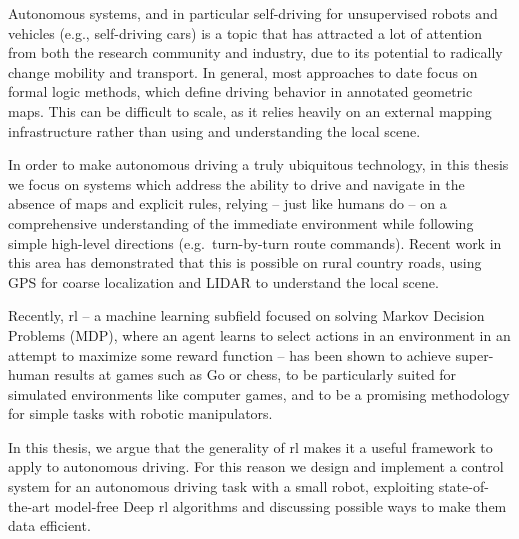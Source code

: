 		
			Autonomous systems, and in particular self-driving for unsupervised robots and vehicles (e.g., self-driving cars) is a topic that has attracted a lot of attention from both the research community and industry, due to its potential to radically change mobility and transport. In general, most approaches to date focus on formal logic methods, which define driving behavior in annotated geometric maps. This can be difficult to scale, as it relies heavily on an external mapping infrastructure rather than using and understanding the local scene.
			
			In order to make autonomous driving a truly ubiquitous technology, in this thesis we focus on systems which address the ability to drive and navigate in the absence of maps and explicit rules, relying – just like humans do – on a comprehensive understanding of the immediate environment while following simple high-level directions (e.g.\ turn-by-turn route commands). Recent work in this area has demonstrated that this is possible on rural country roads, using GPS for coarse localization and LIDAR to understand the local scene. 
			
			Recently, \gls{rl} – a machine learning subfield focused on solving Markov Decision Problems (MDP), where an agent learns to select actions in an environment in an attempt to maximize some reward function – has been shown to achieve super-human results at games such as Go or chess, to be particularly suited for simulated environments like computer games, and to be a promising methodology for simple tasks with robotic manipulators.
			
			In this thesis, we argue that the generality of \gls{rl} makes it a useful framework to apply to autonomous driving. 
			For this reason we design and implement a control system for an autonomous driving task with a small robot, exploiting state-of-the-art model-free Deep \gls{rl} algorithms and discussing possible ways to make them data efficient.
			
